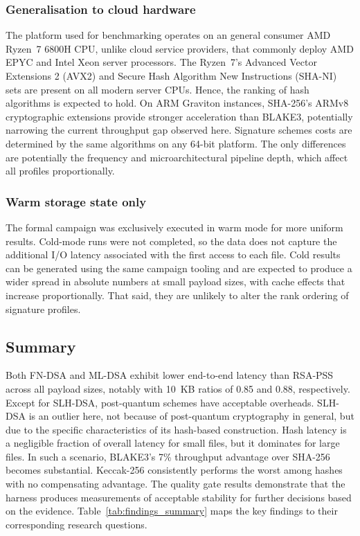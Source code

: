 \documentclass[12pt,a4paper]{article}
\begin{document}
\subsubsection{Generalisation to cloud hardware} The platform used for benchmarking operates on an general consumer AMD Ryzen~7 6800H CPU, unlike cloud service providers, that commonly deploy AMD EPYC and Intel Xeon server processors. The Ryzen~7's Advanced Vector Extensions 2 (AVX2) and Secure Hash Algorithm New Instructions (SHA-NI) sets are present on all modern server CPUs. Hence, the ranking of hash algorithms is expected to hold. On ARM Graviton instances, SHA-256's ARMv8 cryptographic extensions provide stronger acceleration than BLAKE3, potentially narrowing the current throughput gap observed here. Signature schemes costs are determined by the same algorithms on any 64-bit platform. The only differences are potentially the frequency and microarchitectural pipeline depth, which affect all profiles proportionally.

\subsubsection{Warm storage state only} The formal campaign was exclusively executed in warm mode for more uniform results. Cold-mode runs were not completed, so the data does not capture the additional I/O latency associated with the first access to each file. Cold results can be generated using the same campaign tooling and are expected to produce a wider spread in absolute numbers at small payload sizes, with cache effects that increase proportionally. That said, they are unlikely to alter the rank ordering of signature profiles.

\subsection{Summary}
\label{sec:results:summary}

Both FN-DSA and ML-DSA exhibit lower end-to-end latency than RSA-PSS across all payload sizes, notably with 10~KB ratios of 0.85 and 0.88, respectively. Except for SLH-DSA, post-quantum schemes have acceptable overheads. SLH-DSA is an outlier here, not because of post-quantum cryptography in general, but due to the specific characteristics of its hash-based construction. Hash latency is a negligible fraction of overall latency for small files, but it dominates for large files. In such a scenario, BLAKE3's 7\% throughput advantage over SHA-256 becomes substantial. Keccak-256 consistently performs the worst among hashes with no compensating advantage. The quality gate results demonstrate that the harness produces measurements of acceptable stability for further decisions based on the evidence. Table~\ref{tab:findings_summary} maps the key findings to their corresponding research questions.
\end{document}
